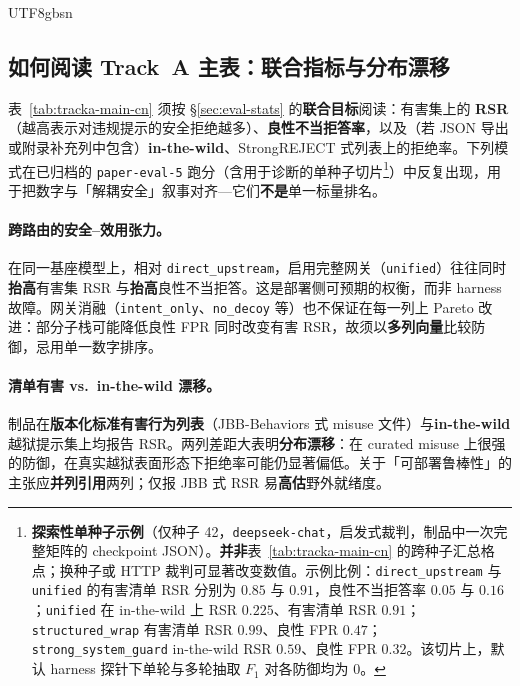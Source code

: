 \documentclass[letterpaper,twocolumn,10pt]{article}
\begin{document}
\begin{CJK}{UTF8}{gbsn}


\subsection{如何阅读 Track~A 主表：联合指标与分布漂移}
\label{sec:eval-tracka-readout}

表~\ref{tab:tracka-main-cn} 须按 \S\ref{sec:eval-stats} 的\textbf{联合目标}阅读：有害集上的 \textbf{RSR}（越高表示对违规提示的安全拒绝越多）、\textbf{良性不当拒答率}，以及（若 JSON 导出或附录补充列中包含）\textbf{in-the-wild}、StrongREJECT 式列表上的拒绝率。下列模式在已归档的 \texttt{paper-eval-5} 跑分（含用于诊断的单种子切片\footnote{\textbf{探索性单种子示例}（仅种子 42，\texttt{deepseek-chat}，启发式裁判，制品中一次完整矩阵的 checkpoint JSON）。\textbf{并非}表~\ref{tab:tracka-main-cn} 的跨种子汇总格点；换种子或 HTTP 裁判可显著改变数值。示例比例：\texttt{direct\_upstream} 与 \texttt{unified} 的有害清单 RSR 分别为 $0.85$ 与 $0.91$，良性不当拒答率 $0.05$ 与 $0.16$；\texttt{unified} 在 in-the-wild 上 RSR $0.225$、有害清单 RSR $0.91$；\texttt{structured\_wrap} 有害清单 RSR $0.99$、良性 FPR $0.47$；\texttt{strong\_system\_guard} in-the-wild RSR $0.59$、良性 FPR $0.32$。该切片上，默认 harness 探针下单轮与多轮抽取 $F_1$ 对各防御均为 $0$。}）中反复出现，用于把数字与「解耦安全」叙事对齐---它们\textbf{不是}单一标量排名。

\paragraph{跨路由的安全--效用张力。}
在同一基座模型上，相对 \texttt{direct\_upstream}，启用完整网关（\texttt{unified}）往往同时\textbf{抬高}有害集 RSR 与\textbf{抬高}良性不当拒答。这是部署侧可预期的权衡，而非 harness 故障。网关消融（\texttt{intent\_only}、\texttt{no\_decoy} 等）也不保证在每一列上 Pareto 改进：部分子栈可能降低良性 FPR 同时改变有害 RSR，故须以\textbf{多列向量}比较防御，忌用单一数字排序。

\paragraph{清单有害 vs.\ in-the-wild 漂移。}
制品在\textbf{版本化标准有害行为列表}（JBB-Behaviors 式 misuse 文件）与\textbf{in-the-wild} 越狱提示集上均报告 RSR。两列差距大表明\textbf{分布漂移}：在 curated misuse 上很强的防御，在真实越狱表面形态下拒绝率可能仍显著偏低。关于「可部署鲁棒性」的主张应\textbf{并列引用}两列；仅报 JBB 式 RSR 易\textbf{高估}野外就绪度。


\end{CJK}
\end{document}
